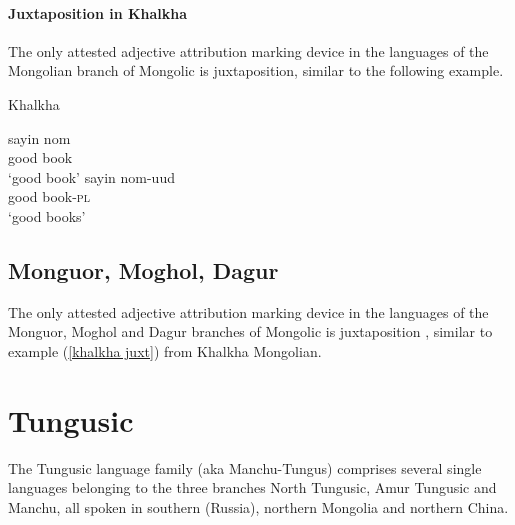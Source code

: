 \paragraph*{Juxtaposition in Khalkha}\hspace{0.4cm}
The only attested adjective attribution marking device in the languages of the Mongolian branch of Mongolic is juxtaposition, similar to the following example.
\begin{exe}
\ex \rm{Khalkha \citep{svantesson2003}}
\label{khalkha juxt}
\begin{xlist}
\ex
\gll	sayin nom\\
	good book\\
\glt	‘good book’
\ex 
\gll	sayin nom-uud\\
	good book-\textsc{pl}\\
\glt ‘good books’
\end{xlist}
\end{exe}

\subsection{Monguor, Moghol, Dagur}
The only attested adjective attribution marking device in the languages of the Monguor, Moghol and Dagur branches of Mongolic is juxtaposition \citep{slater2003,weiers2003,tsumagari2003}, similar to example (\ref{khalkha juxt}) from Khalkha Mongolian.

\section{Tungusic} \label{tungusic synchr}
The Tungusic language family (aka Manchu-Tungus) comprises several single languages belonging to the three branches North Tungusic, Amur Tungusic and Manchu, all spoken in southern  (Russia), northern Mongolia and northern China.

